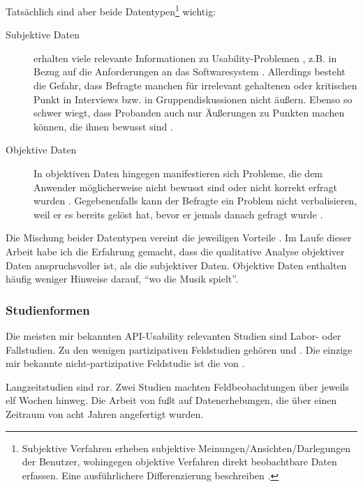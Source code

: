 Tatsächlich sind aber beide Datentypen\footnote{Subjektive Verfahren erheben subjektive Meinungen/Ansichten/Darlegungen der Benutzer, wohingegen objektive Verfahren direkt beobachtbare Daten erfassen. Eine ausführlichere Differenzierung beschreiben \cite{Sarodnick:2006vc}.} wichtig:
\begin{description}
  \item[Subjektive Daten] erhalten viele relevante Informationen zu Usability-Problemen \citep{Rosson:2001uf,Stylos:2008cu,Robillard:2010bh,DaqingHou:2005ba}, z.B. in Bezug auf die Anforderungen an das Softwaresystem \citep{eagan2008buzz}. Allerdings besteht die Gefahr, dass Befragte manchen für irrelevant gehaltenen \citep{Daughtry:2009be} oder kritischen Punkt in Interviews \citep[\textit{soziale Erwünschtheit},][]{Hartmann:1991ju} bzw. in Gruppendiskussionen \citep[\textit{Schweigespirale},][]{NoelleNeumann:1989db} nicht äußern. Ebenso so schwer wiegt, dass Probanden auch nur Äußerungen zu Punkten machen können, die ihnen bewusst sind \citep{Ko:2011el}.
  \item[Objektive Daten] In objektiven Daten hingegen manifestieren sich Probleme, die dem Anwender möglicherweise nicht bewusst sind oder nicht korrekt erfragt wurden \citep{Ko:2011el}. Gegebenenfalls kann der Befragte ein Problem nicht verbalisieren, weil er es bereits gelöst hat, bevor er jemals danach gefragt wurde \citep{sunshine2014searching}.
\end{description}

Die Mischung beider Datentypen vereint die jeweiligen Vorteile \citep{Sarodnick:2006vc}. Im Laufe dieser Arbeit habe ich die Erfahrung gemacht, dass die qualitative Analyse objektiver Daten anspruchsvoller ist, als die subjektiver Daten. Objektive Daten enthalten häufig weniger Hinweise darauf, ``wo die Musik spielt''.



\subsubsection{Studienformen}

Die meisten mir bekannten API-Usability relevanten Studien sind Labor- oder Fallstudien. Zu den wenigen partizipativen Feldstudien gehören \cite{Letondal:2006dy} und \cite{Tenny:2011jp}. Die einzige mir bekannte nicht-partizipative Feldstudie ist die von \cite{deSouza:2004fd}.

Langzeitstudien sind rar. Zwei Studien \citep{Tenny:2011jp,deSouza:2004fd} machten Feldbeobachtungen über jeweils elf Wochen hinweg. Die Arbeit von \cite{Letondal:2006dy} fußt auf Datenerhebungen, die über einen Zeitraum von acht Jahren angefertigt wurden.





